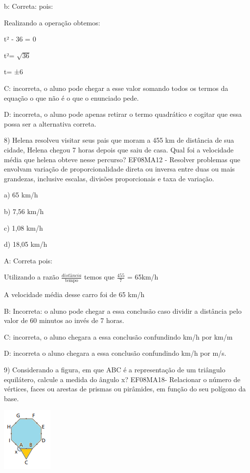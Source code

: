 b: Correta: pois:

Realizando a operação obtemos:

t² - 36 = 0

t²= \(\sqrt{36}\)

t= ±6

C: incorreta, o aluno pode chegar a esse valor somando todos os termos
da equação o que não é o que o enunciado pede.

D: incorreta, o aluno pode apenas retirar o termo quadrático e cogitar
que essa possa ser a alternativa correta.

8) Helena resolveu visitar seus pais que moram a 455 km de distância de
sua cidade, Helena chegou 7 horas depois que saiu de casa. Qual foi a
velocidade média que helena obteve nesse percurso? EF08MA12 - Resolver
problemas que envolvam variação de proporcionalidade direta ou inversa
entre duas ou mais grandezas, inclusive escalas, divisões proporcionais
e taxa de variação.

a) 65 km/h

b) 7,56 km/h

c) 1,08 km/h

d) 18,05 km/h

A: Correta pois:

Utilizando a razão \(\frac{distância}{\text{tempo}}\) temos que
\(\frac{455}{7}\) = 65km/h

A velocidade média desse carro foi de 65 km/h

B: Incorreta: o aluno pode chegar a essa conclusão caso dividir a
distância pelo valor de 60 minutos ao invés de 7 horas.

C: incorreta, o aluno chegara a essa conclusão confundindo km/h por km/m

D: incorreta o aluno chegara a essa conclusão confundindo km/h por m/s.

9) Considerando a figura, em que ABC é a representação de um triângulo
equilátero, calcule a medida do ângulo x? EF08MA18- Relacionar o número
de vértices, faces ou arestas de prismas ou pirâmides, em função do seu
polígono da base.

\includegraphics[width=0.98958in,height=1.26042in]{./imgSAEB_8_MAT/media/image56.png}

